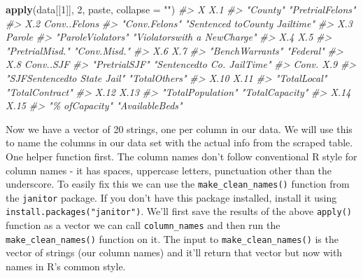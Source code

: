 \documentclass[
  12pt,
]{book}
\newenvironment{Shaded}{\begin{snugshade}}{\end{snugshade}}
\newcommand{\CommentTok}[1]{\textcolor[rgb]{0.37,0.37,0.37}{\textit{#1}}}
\newcommand{\DataTypeTok}[1]{\textcolor[rgb]{0.27,0.27,0.27}{#1}}
\newcommand{\DecValTok}[1]{\textcolor[rgb]{0.06,0.06,0.06}{#1}}
\newcommand{\KeywordTok}[1]{\textcolor[rgb]{0.27,0.27,0.27}{\textbf{#1}}}
\newcommand{\NormalTok}[1]{#1}
\newcommand{\StringTok}[1]{\textcolor[rgb]{0.5,0.5,0.5}{#1}}
\begin{document}
\begin{Shaded}
\begin{Highlighting}[]
\KeywordTok{apply}\NormalTok{(data[[}\DecValTok{1}\NormalTok{]], }\DecValTok{2}\NormalTok{, paste, }\DataTypeTok{collapse =} \StringTok{""}\NormalTok{)}
\CommentTok{\#\textgreater{}                             X                           X.1 }
\CommentTok{\#\textgreater{}                      "County"              "PretrialFelons" }
\CommentTok{\#\textgreater{}                           X.2                  Conv..Felons }
\CommentTok{\#\textgreater{}                 "Conv.Felons" "Sentenced toCounty Jailtime" }
\CommentTok{\#\textgreater{}                           X.3                        Parole }
\CommentTok{\#\textgreater{}             "ParoleViolators"   "Violatorswith a NewCharge" }
\CommentTok{\#\textgreater{}                           X.4                           X.5 }
\CommentTok{\#\textgreater{}               "PretrialMisd."                  "Conv.Misd." }
\CommentTok{\#\textgreater{}                           X.6                           X.7 }
\CommentTok{\#\textgreater{}               "BenchWarrants"                     "Federal" }
\CommentTok{\#\textgreater{}                           X.8                     Conv..SJF }
\CommentTok{\#\textgreater{}                 "PretrialSJF"    "Sentencedto Co. JailTime" }
\CommentTok{\#\textgreater{}                         Conv.                           X.9 }
\CommentTok{\#\textgreater{}   "SJFSentencedto State Jail"                 "TotalOthers" }
\CommentTok{\#\textgreater{}                          X.10                          X.11 }
\CommentTok{\#\textgreater{}                  "TotalLocal"               "TotalContract" }
\CommentTok{\#\textgreater{}                          X.12                          X.13 }
\CommentTok{\#\textgreater{}             "TotalPopulation"               "TotalCapacity" }
\CommentTok{\#\textgreater{}                          X.14                          X.15 }
\CommentTok{\#\textgreater{}                "\% ofCapacity"               "AvailableBeds"}
\end{Highlighting}
\end{Shaded}

Now we have a vector of 20 strings, one per column in our data. We will use this to name the columns in our data set with the actual info from the scraped table. One helper function first. The column names don't follow conventional R style for column names - it has spaces, uppercase letters, punctuation other than the underscore. To easily fix this we can use the \texttt{make\_clean\_names()} function from the \texttt{janitor} package. If you don't have this package installed, install it using \texttt{install.packages("janitor")}. We'll first save the results of the above \texttt{apply()} function as a vector we can call \texttt{column\_names} and then run the \texttt{make\_clean\_names()} function on it. The input to \texttt{make\_clean\_names()} is the vector of strings (our column names) and it'll return that vector but now with names in R's common style.
\end{document}
